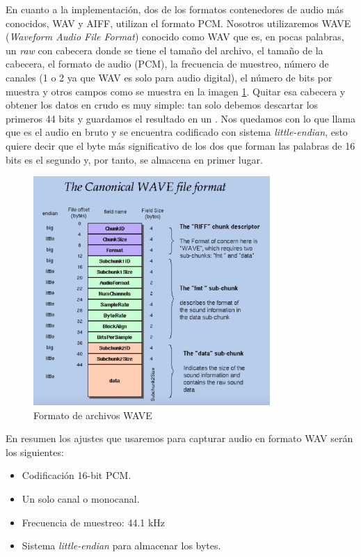 En cuanto a la implementación, dos de los formatos contenedores de audio más conocidos, WAV y AIFF, utilizan el formato PCM. Nosotros utilizaremos WAVE (\emph{Waveform Audio File Format}) conocido como WAV que es, en pocas palabras, un \emph{raw} con cabecera donde se tiene el tamaño del archivo, el tamaño de la cabecera, el formato de audio (PCM), la frecuencia de muestreo, número de canales (1 o 2 ya que WAV es solo para audio digital), el número de bits por muestra y otros campos como se muestra en la imagen \ref{fig:waveFormat}. Quitar esa cabecera y obtener los datos en crudo es muy simple: tan solo debemos descartar los primeros 44 bits y guardamos el resultado en un . Nos quedamos con lo que llama  que es el audio en bruto y se encuentra codificado con sistema \emph{little-endian}, esto quiere decir que el byte más significativo de los dos que forman las palabras de 16 bits es el segundo y, por tanto, se almacena en primer lugar.

\begin{figure}[th]
\centering
\includegraphics[width=9cm]{Figures/wave_format}
\decoRule
\caption[waveFormat]{Formato de archivos WAVE}
\label{fig:waveFormat}
\end{figure}

En resumen los ajustes que usaremos para capturar audio en formato WAV serán los siguientes:
\begin{itemize}
\item Codificación 16-bit PCM. 
\item Un solo canal o monocanal.
\item Frecuencia de muestreo: 44.1 kHz
\item Sistema \emph{little-endian} para almacenar los bytes.
\end{itemize}

